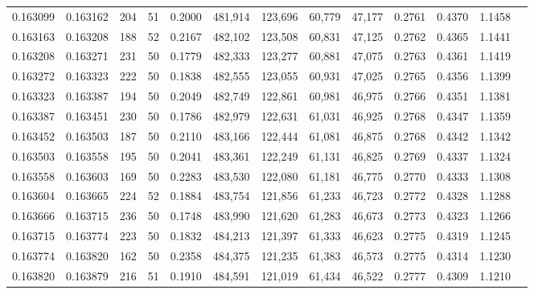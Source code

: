 \begin{tabular}{rrrrrrrrrrrrr}
0.163099 & 0.163162 &   204 &  51 &                                     0.2000 & 481,914 & 123,696 &  60,779 &  47,177 & 0.2761 & 0.4370 & 1.1458 \\
0.163163 & 0.163208 &   188 &  52 &                                     0.2167 & 482,102 & 123,508 &  60,831 &  47,125 & 0.2762 & 0.4365 & 1.1441 \\
0.163208 & 0.163271 &   231 &  50 &                                     0.1779 & 482,333 & 123,277 &  60,881 &  47,075 & 0.2763 & 0.4361 & 1.1419 \\
0.163272 & 0.163323 &   222 &  50 &                                     0.1838 & 482,555 & 123,055 &  60,931 &  47,025 & 0.2765 & 0.4356 & 1.1399 \\
0.163323 & 0.163387 &   194 &  50 &                                     0.2049 & 482,749 & 122,861 &  60,981 &  46,975 & 0.2766 & 0.4351 & 1.1381 \\
0.163387 & 0.163451 &   230 &  50 &                                     0.1786 & 482,979 & 122,631 &  61,031 &  46,925 & 0.2768 & 0.4347 & 1.1359 \\
0.163452 & 0.163503 &   187 &  50 &                                     0.2110 & 483,166 & 122,444 &  61,081 &  46,875 & 0.2768 & 0.4342 & 1.1342 \\
0.163503 & 0.163558 &   195 &  50 &                                     0.2041 & 483,361 & 122,249 &  61,131 &  46,825 & 0.2769 & 0.4337 & 1.1324 \\
0.163558 & 0.163603 &   169 &  50 &                                     0.2283 & 483,530 & 122,080 &  61,181 &  46,775 & 0.2770 & 0.4333 & 1.1308 \\
0.163604 & 0.163665 &   224 &  52 &                                     0.1884 & 483,754 & 121,856 &  61,233 &  46,723 & 0.2772 & 0.4328 & 1.1288 \\
0.163666 & 0.163715 &   236 &  50 &                                     0.1748 & 483,990 & 121,620 &  61,283 &  46,673 & 0.2773 & 0.4323 & 1.1266 \\
0.163715 & 0.163774 &   223 &  50 &                                     0.1832 & 484,213 & 121,397 &  61,333 &  46,623 & 0.2775 & 0.4319 & 1.1245 \\
0.163774 & 0.163820 &   162 &  50 &                                     0.2358 & 484,375 & 121,235 &  61,383 &  46,573 & 0.2775 & 0.4314 & 1.1230 \\
0.163820 & 0.163879 &   216 &  51 &                                     0.1910 & 484,591 & 121,019 &  61,434 &  46,522 & 0.2777 & 0.4309 & 1.1210 \\

\end{tabular}
